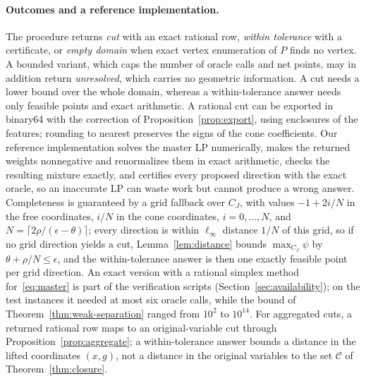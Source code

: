 \paragraph{Outcomes and a reference implementation.}
The procedure returns \emph{cut} with an exact rational row, \emph{within
tolerance} with a certificate, or \emph{empty domain} when exact vertex
enumeration of $P$ finds no vertex. A bounded variant, which caps the number
of oracle calls and net points, may in addition return \emph{unresolved},
which carries no geometric information. A cut needs a lower bound over the
whole domain, whereas a within-tolerance answer needs only feasible points
and exact arithmetic. A rational cut can be exported in binary64 with the
correction of Proposition~\ref{prop:export}, using enclosures of the
features; rounding to nearest preserves the signs of the cone coefficients.
Our reference implementation solves the master LP numerically, makes the
returned weights nonnegative and renormalizes them in exact arithmetic,
checks the resulting mixture exactly, and certifies every proposed direction
with the exact oracle, so an inaccurate LP can waste work but cannot produce
a wrong answer. Completeness is guaranteed by a grid fallback over $C_J$, with
values $-1+2i/N$ in the free coordinates, $i/N$ in the cone coordinates,
$i=0,\dots,N$, and $N=\lceil2\rho/(\epsilon-\theta)\rceil$; every direction is within
$\ell_\infty$ distance $1/N$ of this grid, so if no grid direction yields a cut,
Lemma~\ref{lem:distance} bounds $\max_{C_J}\psi$ by $\theta+\rho/N\le\epsilon$, and the
within-tolerance answer is then one exactly feasible point per grid direction.
An exact version with a rational simplex method for~\eqref{eq:master} is part
of the verification scripts (Section~\ref{sec:availability}); on the test
instances it needed at most six oracle calls, while the bound of
Theorem~\ref{thm:weak-separation} ranged from $10^2$ to $10^{14}$. For
aggregated cuts, a returned rational row maps to an original-variable cut
through Proposition~\ref{prop:aggregate}; a within-tolerance answer bounds a
distance in the lifted coordinates $(x,g)$, not a distance in the original
variables to the set $\mathcal C$ of Theorem~\ref{thm:closure}.
